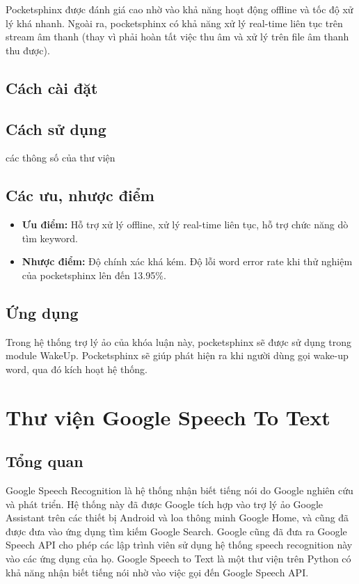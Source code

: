 Pocketsphinx được đánh giá cao nhờ vào khả năng hoạt động offline và tốc độ xử lý khá nhanh. Ngoài ra, pocketsphinx có khả năng xử lý real-time liên tục trên stream âm thanh (thay vì phải hoàn tất việc thu âm và xử lý trên file âm thanh thu được).

\subsection{Cách cài đặt}

\subsection{Cách sử dụng}

các thông số của thư viện

\subsection{Các ưu, nhược điểm}

\begin{itemize}
    \item \textbf{Ưu điểm:} Hỗ trợ xử lý offline, xử lý real-time liên tục, hỗ trợ chức năng dò tìm keyword.
    \item \textbf{Nhược điểm:} Độ chính xác khá kém. Độ lỗi word error rate khi thử nghiệm của pocketsphinx lên đến 13.95\%\cite{huggins2006pocketsphinx}.
\end{itemize}

\subsection{Ứng dụng}

Trong hệ thống trợ lý ảo của khóa luận này, pocketsphinx sẽ được sử dụng trong module WakeUp. Pocketsphinx sẽ giúp phát hiện ra khi người dùng gọi wake-up word, qua đó kích hoạt hệ thống.

\section{Thư viện Google Speech To Text}

\subsection{Tổng quan}

Google Speech Recognition là hệ thống nhận biết tiếng nói do Google nghiên cứu và phát triển. Hệ thống này đã được Google tích hợp vào trợ lý ảo Google Assistant trên các thiết bị Android và loa thông minh Google Home, và cũng đã được đưa vào ứng dụng tìm kiếm Google Search. Google cũng đã đưa ra Google Speech API cho phép các lập trình viên sử dụng hệ thống speech recognition này vào các ứng dụng của họ. Google Speech to Text là một thư viện trên Python có khả năng nhận biết tiếng nói nhờ vào việc gọi đến Google Speech API.

